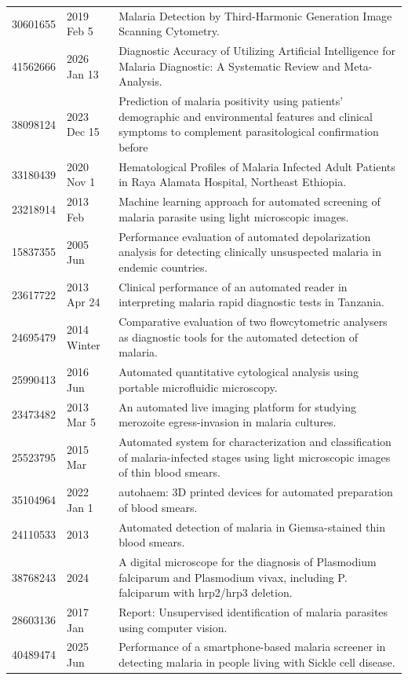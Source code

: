 \begin{longtable}{llp{9.5cm}}
30601655 & 2019 Feb 5 & Malaria Detection by Third-Harmonic Generation Image Scanning Cytometry. \\
41562666 & 2026 Jan 13 & Diagnostic Accuracy of Utilizing Artificial Intelligence for Malaria Diagnostic: A Systematic Review and Meta-Analysis. \\
38098124 & 2023 Dec 15 & Prediction of malaria positivity using patients' demographic and environmental features and clinical symptoms to complement parasitological confirmation before  \\
33180439 & 2020 Nov 1 & Hematological Profiles of Malaria Infected Adult Patients in Raya Alamata Hospital, Northeast Ethiopia. \\
23218914 & 2013 Feb & Machine learning approach for automated screening of malaria parasite using light microscopic images. \\
15837355 & 2005 Jun & Performance evaluation of automated depolarization analysis for detecting clinically unsuspected malaria in endemic countries. \\
23617722 & 2013 Apr 24 & Clinical performance of an automated reader in interpreting malaria rapid diagnostic tests in Tanzania. \\
24695479 & 2014 Winter & Comparative evaluation of two flowcytometric analysers as diagnostic tools for the automated detection of malaria. \\
25990413 & 2016 Jun & Automated quantitative cytological analysis using portable microfluidic microscopy. \\
23473482 & 2013 Mar 5 & An automated live imaging platform for studying merozoite egress-invasion in malaria cultures. \\
25523795 & 2015 Mar & Automated system for characterization and classification of malaria-infected stages using light microscopic images of thin blood smears. \\
35104964 & 2022 Jan 1 & autohaem: 3D printed devices for automated preparation of blood smears. \\
24110533 & 2013 & Automated detection of malaria in Giemsa-stained thin blood smears. \\
38768243 & 2024 & A digital microscope for the diagnosis of Plasmodium falciparum and Plasmodium vivax, including P. falciparum with hrp2/hrp3 deletion. \\
28603136 & 2017 Jan & Report: Unsupervised identification of malaria parasites using computer vision. \\
40489474 & 2025 Jun & Performance of a smartphone-based malaria screener in detecting malaria in people living with Sickle cell disease. \\

\end{longtable}
